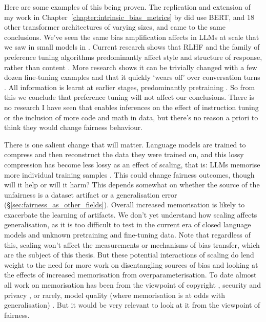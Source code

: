 Here are some examples of this being proven. The replication and extension of my work in Chapter~\ref{chapter:intrinsic_bias_metrics} by \citet{cao-etal-2022-intrinsic} did use BERT, and 18 other transformer architectures of varying sizes, and came to the same conclusions. We've seen the same bias amplification affects in LLMs at scale \citep{bianchi-2023} that we saw in small models in \citet{zhao-etal-2017-men}. Current research shows that RLHF and the family of preference tuning algorithms predominantly affect style and structure of response, rather than content \citep{min-etal-2022-rethinking,  lin2023unlocking}. More research shows it can be trivially changed with a few dozen fine-tuning examples \citep{qi2023finetuning} and that it quickly `wears off' over conversation turns \citep{llama2}. All information is learnt at earlier stages, predominantly pretraining \citep{zhou2023lima}. So from this we conclude that preference tuning will not affect our conclusions. There is no research I have seen that enables inferences on the effect of instruction tuning or the inclusion of more code and math in data, but there's no reason a priori to think they would change fairness behaviour.  

There is one salient change that will matter. Language models are trained to compress and then reconstruct the data they were trained on, and this lossy compression has become less lossy as an effect of scaling, that is: LLMs memorise more individual training samples \citep{karamolegkou-etal-2023-copyright}. This could change fairness outcomes, though will it help or will it harm? This depends somewhat on whether the source of the unfairness is a dataset artifact or a generalisation error (\S \ref{sec:fairness_as_other_fields}). Overall increased memorisation is likely to exacerbate the learning of artifacts. We don't yet understand how scaling affects generalisation, as it is too difficult to test in the current era of closed language models and unknown pretraining and fine-tuning data. Note that regardless of this, scaling won't affect the measurements or mechanisms of bias transfer, which are the subject of this thesis. But these potential interactions of scaling do lend weight to the need for more work on disentangling sources of bias and looking at the effects of increased memorisation from overparameterisation. To date almost all work on memorisation has been from the viewpoint of copyright \citep{karamolegkou-etal-2023-copyright}, security and privacy \citep{smith2023identifying, hartmann2023sok}, or rarely, model quality (where memorisation is at odds with generalisation) \citep{tanzer-etal-2022-memorisation}. But it would be very relevant to look at it from the viewpoint of fairness.
 
